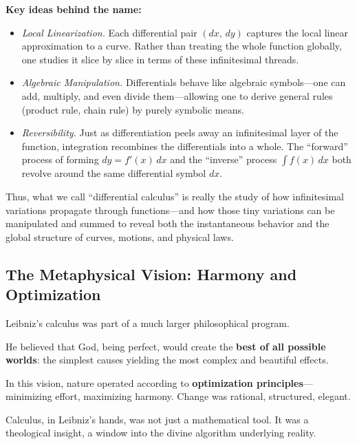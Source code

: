 \medskip

\noindent\textbf{Key ideas behind the name:}
\begin{itemize}
  \item \emph{Local Linearization.}  Each differential pair \((dx,\,dy)\) captures the local linear approximation to a curve.  Rather than treating the whole function globally, one studies it slice by slice in terms of these infinitesimal threads.
  \item \emph{Algebraic Manipulation.}  Differentials behave like algebraic symbols—one can add, multiply, and even divide them—allowing one to derive general rules (product rule, chain rule) by purely symbolic means.
  \item \emph{Reversibility.}  Just as differentiation peels away an infinitesimal layer of the function, integration recombines the differentials into a whole.  The “forward” process of forming \(dy = f'(x)\,dx\) and the “inverse” process \(\int f(x)\,dx\) both revolve around the same differential symbol \(dx\).
\end{itemize}

Thus, what we call “differential calculus” is really the study of how infinitesimal variations propagate through functions—and how those tiny variations can be manipulated and summed to reveal both the instantaneous behavior and the global structure of curves, motions, and physical laws.  










\subsection{The Metaphysical Vision: Harmony and Optimization}

Leibniz's calculus was part of a much larger philosophical program.

He believed that God, being perfect, would create the \textbf{best of all possible worlds}: the simplest 
causes yielding the most complex and beautiful effects.

In this vision, nature operated according to \textbf{optimization principles}—minimizing effort, 
maximizing harmony. Change was rational, structured, elegant.

Calculus, in Leibniz's hands, was not just a mathematical tool. It was a theological insight, a 
window into the divine algorithm underlying reality.

